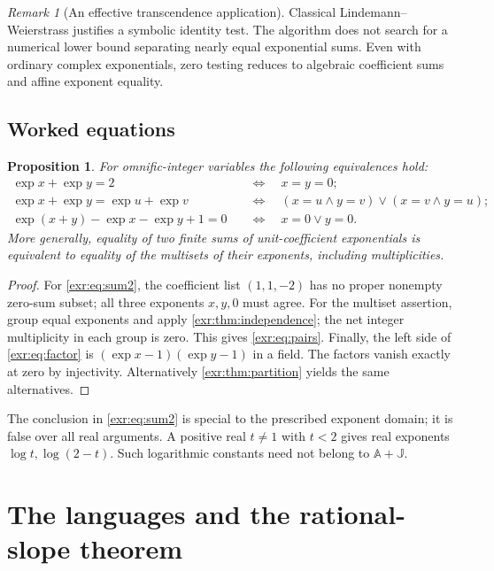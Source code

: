 \documentclass[11pt,letterpaper]{article}
\numberwithin{equation}{section}
\newtheorem{proposition}[proposition]{Proposition}
\theoremstyle{definition}
\theoremstyle{remark}
\newtheorem{remark}[remark]{Remark}
\newcommand{\A}{\mathbb A}
\newcommand{\J}{\mathbb J}
\begin{document}
\begin{remark}[An effective transcendence application]
Classical Lindemann--Weierstrass justifies a symbolic identity test. The algorithm
does not search for a numerical lower bound separating nearly equal exponential
sums. Even with ordinary complex exponentials, zero testing reduces to algebraic
coefficient sums and affine exponent equality.
\end{remark}

\subsection{Worked equations}
\begin{proposition}\label{exr:prop:examples}
For omnific-integer variables the following equivalences hold:
\begin{align}
 \exp x+\exp y=2&\quad\Longleftrightarrow\quad x=y=0;\label{exr:eq:sum2}\\
 \exp x+\exp y=\exp u+\exp v
 &\quad\Longleftrightarrow\quad
 (x=u\land y=v)\lor(x=v\land y=u);\label{exr:eq:pairs}\\
 \exp(x+y)-\exp x-\exp y+1=0
 &\quad\Longleftrightarrow\quad x=0\lor y=0.\label{exr:eq:factor}
\end{align}
More generally, equality of two finite sums of unit-coefficient exponentials is
equivalent to equality of the multisets of their exponents, including
multiplicities.
\end{proposition}
\begin{proof}
For \eqref{exr:eq:sum2}, the coefficient list $(1,1,-2)$ has no proper nonempty
zero-sum subset; all three exponents $x,y,0$ must agree. For the multiset assertion,
group equal exponents and apply \cref{exr:thm:independence}; the net integer
multiplicity in each group is zero. This gives \eqref{exr:eq:pairs}. Finally, the left
side of \eqref{exr:eq:factor} is $(\exp x-1)(\exp y-1)$ in a field. The factors vanish
exactly at zero by injectivity. Alternatively \cref{exr:thm:partition} yields the
same alternatives.
\end{proof}

The conclusion in \eqref{exr:eq:sum2} is special to the prescribed exponent domain;
it is false over all real arguments. A positive real $t\ne1$ with $t<2$ gives
real exponents $\log t,\log(2-t)$. Such logarithmic constants need not belong to
$\A+\J$.

\section{The languages and the rational-slope theorem}\label{exr:sec:rational}
\end{document}
